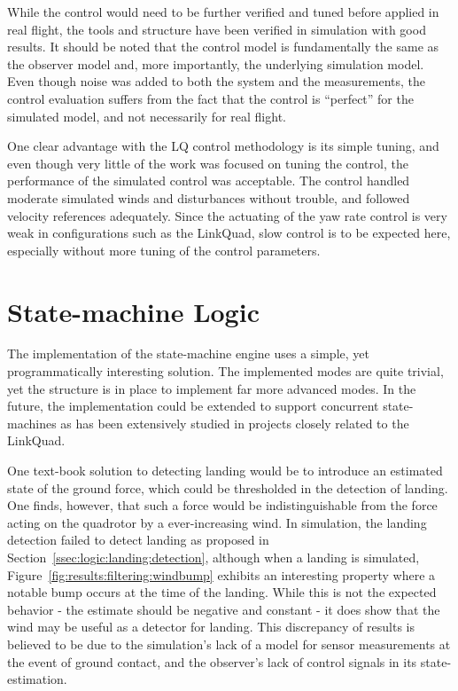         While the control would need to be further verified and tuned before applied in real flight,
        the tools and structure have been verified in simulation with good results.
        It should be noted that the control model is fundamentally the same
        as the observer model and, more importantly, the underlying simulation
        model. Even though noise was added to both the system and the measurements,
        the control evaluation suffers from the fact that the control is ``perfect'' for the
        simulated model, and not necessarily for real flight.

        One clear advantage with the LQ control methodology is its simple
        tuning, and even though very little of the work was focused on
        tuning the control, the performance of the simulated control was acceptable.
        The control handled moderate simulated winds and disturbances without trouble, and
        followed velocity references adequately.
        Since the actuating of the yaw rate control is very weak in
        configurations such as the LinkQuad, slow control
        is to be expected here, especially without more tuning of the control
        parameters.

    \section{State-machine Logic}
        The implementation of the state-machine engine uses a simple, yet
        programmatically interesting solution. The implemented modes
        are quite trivial, yet the structure is in place to implement
        far more advanced modes. In the future, the implementation could
        be extended to support concurrent state-machines as has been
        extensively studied in projects closely related to the LinkQuad.

        One text-book solution to detecting landing would be to introduce
        an estimated state of the ground force, which could be thresholded
        in the detection of landing. One finds, however,
        that such a force would be indistinguishable from
        the force acting on the quadrotor by a ever-increasing wind.
        In simulation, the landing detection failed to detect landing
        as proposed in Section~\ref{ssec:logic:landing:detection}, although
        when a landing is simulated, Figure~\ref{fig:results:filtering:windbump}
        exhibits an interesting property where a notable bump occurs at the
        time of the landing. While this is not the expected behavior
        - the estimate should be negative and constant -
        it does show that the wind may be useful as a detector for landing.
        This discrepancy of results is believed to be due to
        the simulation's lack of a model for sensor measurements at the event of ground contact,
        and the observer's lack of control signals in its state-estimation.

